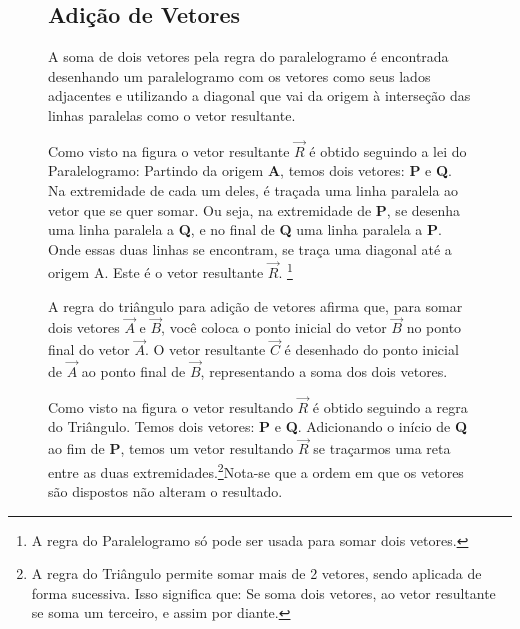 \documentclass[a4paper, 14pt, twoside]{article}
\begin{document}
\begin{figure}[h]
\begin{minipage}[t]{0.55\textwidth}
\subsection{Adição de Vetores}
        \vspace{1cm}
        \begin{tcolorbox}[colframe=lockheed, colback=white, title=Adição de Vetores - Regra do Paralelogramo, fonttitle=\bfseries]
            A soma de dois vetores pela regra do paralelogramo é encontrada desenhando um paralelogramo com os vetores como seus lados adjacentes e utilizando a diagonal que vai da origem à interseção das linhas paralelas como o vetor resultante.
        \end{tcolorbox}
            Como visto na figura o vetor resultante $\vec{R}$ é obtido seguindo a lei do Paralelogramo: Partindo da origem \textbf{A}, temos dois vetores: \textbf{P} e \textbf{Q}. Na extremidade de cada um deles, é traçada uma linha paralela ao vetor que se quer somar. Ou seja, na extremidade de \textbf{P}, se desenha uma linha paralela a \textbf{Q}, e no final de \textbf{Q} uma linha paralela a \textbf{P}. Onde essas duas linhas se encontram, se traça uma diagonal até a origem A. Este é o vetor resultante $\vec{R}$. \footnote{A regra do Paralelogramo só pode ser usada para somar dois vetores.}
        \begin{tcolorbox}[colframe=lockheed, colback=white, title=Adição de Vetores - Regra do Triângulo, fonttitle=\bfseries]
            A regra do triângulo para adição de vetores afirma que, para somar dois vetores $\vec{A}$ e $\vec{B}$, você coloca o ponto inicial do vetor $\vec{B}$ no ponto final do vetor $\vec{A}$. O vetor resultante $\vec{C}$ é desenhado do ponto inicial de $\vec{A}$ ao ponto final de $\vec{B}$, representando a soma dos dois vetores.
        \end{tcolorbox}
            Como visto na figura o vetor resultando $\vec{R}$ é obtido seguindo a regra do Triângulo. Temos dois vetores: \textbf{P} e \textbf{Q}. Adicionando o início de \textbf{Q} ao fim de \textbf{P}, temos um vetor resultando $\vec{R}$ se traçarmos uma reta entre as duas extremidades.\footnote{A regra do Triângulo permite somar mais de 2 vetores, sendo aplicada de forma sucessiva. Isso significa que: Se soma dois vetores, ao vetor resultante se soma um terceiro, e assim por diante.}Nota-se que a ordem em que os vetores são dispostos não alteram o resultado.
    \end{minipage}
    \begin{minipage}[t]{0.4\textwidth}

\end{minipage}
\end{figure}
\end{document}
